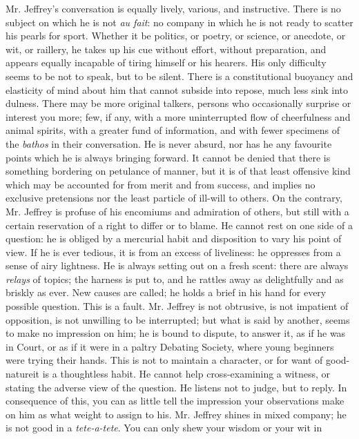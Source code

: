 Mr. Jeffrey's conversation is equally lively, various, and
instructive.  There is no subject on which he is not \emph{au
  fait}: no company in which he is not ready to scatter his pearls
for sport. Whether it be politics, or poetry, or science, or
anecdote, or wit, or raillery, he takes up his cue without effort,
without preparation, and appears equally incapable of tiring
himself or his hearers. His only difficulty seems to be not to
speak, but to be silent. There is a constitutional buoyancy and
elasticity of mind about him that cannot subside into repose, much
less sink into dulness. There may be more original talkers,
persons who occasionally surprise or interest you more; few, if
any, with a more uninterrupted flow of cheerfulness and animal
spirits, with a greater fund of information, and with fewer
specimens of the \emph{bathos} in their conversation. He is never
absurd, nor has he any favourite points which he is always
bringing forward. It cannot be denied that there is something
bordering on petulance of manner, but it is of that least
offensive kind which may be accounted for from merit and from
success, and implies no exclusive pretensions nor the least
particle of ill-will to others. On the contrary, Mr. Jeffrey is
profuse of his encomiums and admiration of others, but still with
a certain reservation of a right to differ or to blame. He cannot
rest on one side of a question: he is obliged by a mercurial habit
and disposition to vary his point of view.  If he is ever tedious,
it is from an excess of liveliness: he oppresses from a sense of
airy lightness. He is always setting out on a fresh scent: there
are always \emph{relays} of topics; the harness is put to, and he
rattles away as delightfully and as briskly as ever. New causes
are called; he holds a brief in his hand for every possible
question.  This is a fault. Mr. Jeffrey is not obtrusive, is not
impatient of opposition, is not unwilling to be interrupted; but
what is said by another, seems to make no impression on him; he is
bound to dispute, to answer it, as if he was in Court, or as if it
were in a paltry Debating Society, where young beginners were
trying their hands. This is not to maintain a character, or for
want of good-nature\textemdash it is a thoughtless habit. He
cannot help cross-examining a witness, or stating the adverse view
of the question. He listens not to judge, but to reply.  In
consequence of this, you can as little tell the impression your
observations make on him as what weight to assign to
his. Mr. Jeffrey shines in mixed company; he is not good in a
\emph{tete-a-tete}. You can only shew your wisdom or your wit in
